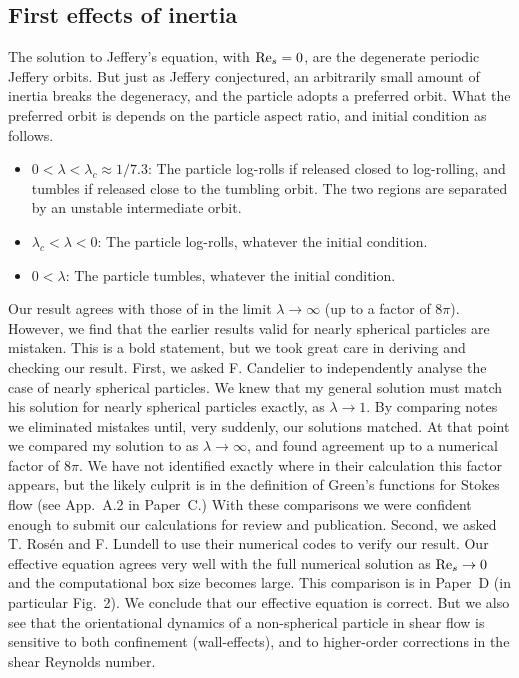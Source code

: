 \documentclass[thesis.tex]{subfiles}
\begin{document}
\subsection*{First effects of inertia}

The solution to Jeffery's equation,  with $\textrm{Re}_s=0$, are the degenerate periodic Jeffery orbits. But just as Jeffery conjectured, an arbitrarily small amount of inertia breaks the degeneracy, and the particle adopts a preferred orbit. What the preferred orbit is depends on the particle aspect ratio, and initial condition as follows.
\begin{itemize}
    \item $0 < \lambda < \lambda_c \approx 1/7.3$: The particle log-rolls if released closed to log-rolling, and tumbles if released close to the tumbling orbit. The two regions are separated by an unstable intermediate orbit.
    \item $\lambda_c < \lambda < 0$: The particle log-rolls, whatever the initial condition.
    \item $0 < \lambda$: The particle tumbles, whatever the initial condition.
\end{itemize}

Our result  agrees with those of \citet{subramanian2005} in the limit $\lambda\to\infty$ (up to a factor of $8\pi$). However, we find that the earlier results valid for nearly spherical particles \cite{saffman1956,subramanian2006} are mistaken. This is a bold statement, but we took great care in deriving and checking our result. First, we asked F. Candelier to independently analyse the case of nearly spherical particles. We knew that my general solution must match his solution for nearly spherical particles exactly, as $\lambda\to1$. By comparing notes we eliminated mistakes until, very suddenly, our solutions matched. At that point we compared my solution to \citet{subramanian2005} as $\lambda\to\infty$, and found agreement up to a numerical factor of $8\pi$. We have not identified exactly where in their calculation this factor appears, but the likely culprit is in the definition of Green's functions for Stokes flow (see App.~A.2 in Paper~C.) With these comparisons we were confident enough to submit our calculations for review and publication. Second, we asked T. Ros\'en and F. Lundell to use their numerical codes to verify our result. Our effective equation  agrees very well with the full numerical solution as $\textrm{Re}_s\to0$ and the computational box size becomes large. This comparison is in Paper~D (in particular Fig.~2). We conclude that our effective equation is correct. But we also see that the orientational dynamics of a non-spherical particle in shear flow is sensitive to both confinement (wall-effects), and to higher-order corrections in the shear Reynolds number.
\end{document}
